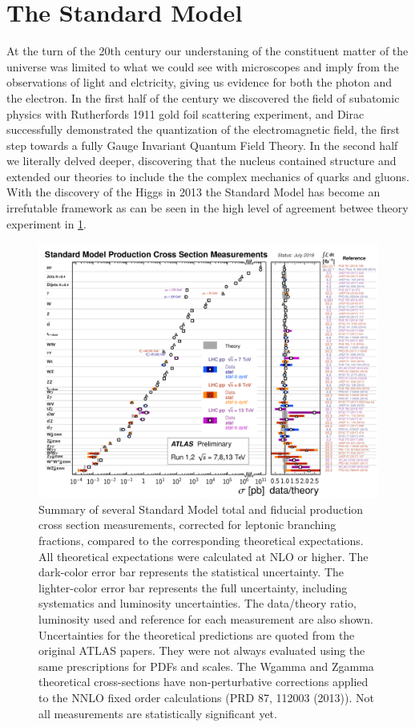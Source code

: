 \section{The Standard Model} \label{sec:theory:standardmodel}

At the turn of the 20th century our understaning of the constituent matter of
the universe was limited to what we could see with microscopes and imply from
the observations of light and elctricity, giving us evidence for both the photon
and the electron.  In the first half of the century we discovered the field of
subatomic physics with Rutherfords 1911 gold foil scattering experiment, and
Dirac successfully demonstrated the quantization of the electromagnetic field,
the first step towards a fully Gauge Invariant Quantum Field Theory.  In the
second half we literally delved deeper, discovering that the nucleus contained
structure and extended our theories to include the the complex mechanics of
quarks and gluons.  With the discovery of the Higgs in 2013 the Standard Model
has become an irrefutable framework as can be seen in the high level of
agreement betwee theory experiment in \cref{fig:xsection_measurements}.

\begin{figure}[!htbp]
  \begin{center}
    \includegraphics[width=0.8\linewidth]{figures/theory/xsection_measurements.pdf}
    \caption{ Summary of several Standard Model total and fiducial production cross section measurements, corrected for leptonic branching fractions, compared to the corresponding theoretical expectations. All theoretical expectations were calculated at NLO or higher. The dark-color error bar represents the statistical uncertainty. The lighter-color error bar represents the full uncertainty, including systematics and luminosity uncertainties. The data/theory ratio, luminosity used and reference for each measurement are also shown. Uncertainties for the theoretical predictions are quoted from the original ATLAS papers. They were not always evaluated using the same prescriptions for PDFs and scales. The Wgamma and Zgamma theoretical cross-sections have non-perturbative corrections applied to the NNLO fixed order calculations (PRD 87, 112003 (2013)). Not all measurements are statistically significant yet.}
    \label{fig:xsection_measurements}
  \end{center}
\end{figure}

